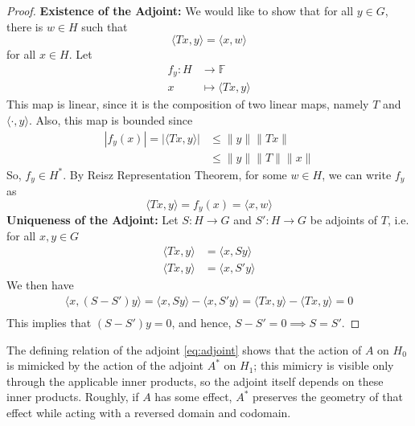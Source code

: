 \documentclass{report}
\begin{document}
\begin{proof}
  \textbf{Existence of the Adjoint:} We would like to show that for all $y\in G$, there is $w\in H$ such that 
  $$\langle Tx,y\rangle = \langle x,w\rangle$$
  for all $x\in H$. Let
  $$
  \begin{aligned}
    f_{y}: H&\longrightarrow\mathbb{F} \\
           x&\longmapsto\langle Tx,y\rangle
  \end{aligned}
  $$
  This map is linear, since it is the composition of two linear maps, namely $T$ and $\langle\cdot,y\rangle$. Also, this map is bounded since
  $$
  \begin{aligned}
    |f_{y}(x)| = |\langle Tx,y\rangle| &\leq \lVert y\rVert\lVert Tx\rVert \\
                                       &\leq \lVert y\rVert\lVert T\rVert \lVert x\rVert
  \end{aligned}
  $$
  So, $f_{y}\in H^{*}$. By Reisz Representation Theorem, for some $w\in H$, we can write $f_{y}$ as
  $$
  \langle Tx,y\rangle = f_{y}(x) = \langle x,w\rangle
  $$
  \newline
  \textbf{Uniqueness of the Adjoint:} Let $S:H\to G$ and $S':H\to G$ be adjoints of $T$, i.e. for all $x,y\in G$
  $$
    \begin{aligned}
      \langle Tx,y\rangle &= \langle x,Sy\rangle \\
      \langle Tx,y\rangle &= \langle x,S'y\rangle
    \end{aligned}
  $$
  We then have
  $$
  \begin{aligned}
    \langle x,(S-S')y\rangle = \langle x,Sy\rangle-\langle x,S'y\rangle = \langle Tx,y\rangle-\langle Tx,y\rangle = 0 \\
  \end{aligned}
  $$
  This implies that $(S-S')y=0$, and hence, $S-S'=0\implies S=S'$.
\end{proof}

The defining relation of the adjoint \eqref{eq:adjoint} shows that the action of $A$ on $H_0$ is mimicked by the action of the adjoint $A^{*}$ on $H_1$; this mimicry is visible only through the applicable inner products, so the adjoint itself depends on these inner products. Roughly, if $A$ has some effect, $A^{*}$ preserves the geometry of that effect while acting with a reversed domain and codomain.
\end{document}
